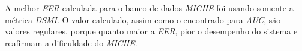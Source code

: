 
\par A melhor \textit{\acrshort{EER}} calculada para o banco de dados \textit{MICHE} foi usando somente a métrica \textit{\acrshort{DSMI}}. O valor calculado, assim como o encontrado para \textit{\acrshort{AUC}}, são valores regulares, porque quanto maior a \textit{\acrshort{EER}}, pior o desempenho do sistema \cite{eer, d33BEAT} e reafirmam a dificuldade do  \textit{MICHE}.


